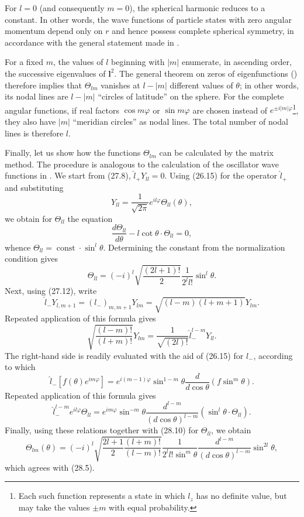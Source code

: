 For $l=0$ (and consequently $m=0$), the spherical harmonic reduces to a
constant. In other words, the wave functions of particle states with zero
angular momentum depend only on $r$ and hence possess complete spherical
symmetry, in accordance with the general statement made in .

For a fixed $m$, the values of $l$ beginning with $|m|$ enumerate, in
ascending order, the successive eigenvalues of $\mathbf l^2$. The general
theorem on zeros of eigenfunctions () therefore implies that
$\Theta_{lm}$ vanishes at $l-|m|$ different values of $\theta$; in other
words, its nodal lines are $l-|m|$ “circles of latitude” on the sphere.
For the complete angular functions, if real factors $\cos m\varphi$ or
$\sin m\varphi$ are chosen instead of
$e^{\pm i|m|\varphi}$\footnote{Each such function represents a state in
which $l_z$ has no definite value, but may take the values $\pm m$ with equal
probability.}, they also have $|m|$ “meridian circles” as nodal lines. The
total number of nodal lines is therefore $l$.

Finally, let us show how the functions $\Theta_{lm}$ can be calculated by the
matrix method. The procedure is analogous to the calculation of the
oscillator wave functions in . We start from (27.8),
$\hat l_+Y_{ll}=0$. Using (26.15) for the operator $\hat l_+$ and substituting
\[
  Y_{ll}=\frac1{\sqrt{2\pi}}e^{il\varphi}\Theta_{ll}(\theta),
\]
we obtain for $\Theta_{ll}$ the equation
\[
  \frac{d\Theta_{ll}}{d\theta}-l\cot\theta\cdot\Theta_{ll}=0,
\]
whence
$\Theta_{ll}=\operatorname{const}\cdot\sin^l\theta$. Determining the constant
from the normalization condition gives
\begin{equation}
 \Theta_{ll}=(-i)^l\sqrt{\frac{(2l+1)!}{2}}\frac1{2^ll!}\sin^l\theta.
 \tag{28.10}
\end{equation}
Next, using (27.12), write
\[
 \hat l_-Y_{l,m+1}=(l_-)_{m,m+1}Y_{lm}
 =\sqrt{(l-m)(l+m+1)}Y_{lm}.
\]
Repeated application of this formula gives
\[
 \sqrt{\frac{(l-m)!}{(l+m)!}}Y_{lm}
 =\frac1{\sqrt{(2l)!}}\hat l_-^{l-m}Y_{ll}.
\]
The right-hand side is readily evaluated with the aid of (26.15) for
$\hat l_-$, according to which
\[
 \hat l_-\left[f(\theta)e^{im\varphi}\right]
 =e^{i(m-1)\varphi}\sin^{1-m}\theta\frac d{d\cos\theta}
 \left(f\sin^m\theta\right).
\]
Repeated application of this formula gives
\[
 \hat l_-^{l-m}e^{il\varphi}\Theta_{ll}
 =e^{im\varphi}\sin^{-m}\theta
 \frac{d^{l-m}}{(d\cos\theta)^{l-m}}
 \left(\sin^l\theta\cdot\Theta_{ll}\right).
\]
Finally, using these relations together with (28.10) for $\Theta_{ll}$, we
obtain
\begin{equation}
 \Theta_{lm}(\theta)=(-i)^l
 \sqrt{\frac{2l+1}{2}\frac{(l+m)!}{(l-m)!}}
 \frac1{2^ll!\sin^m\theta}
 \frac{d^{l-m}}{(d\cos\theta)^{l-m}}\sin^{2l}\theta,
 \tag{28.11}
\end{equation}
which agrees with (28.5).
